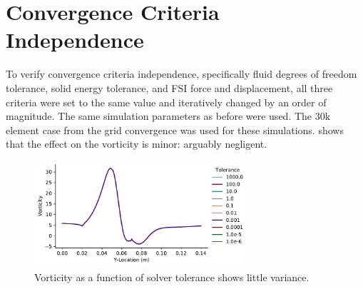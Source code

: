 \documentclass[10pt,english]{article}
\begin{document}
\newpage
\section{Convergence Criteria Independence}

To verify convergence criteria independence, specifically fluid degrees of freedom tolerance, solid energy tolerance, and FSI force and displacement, all three criteria were set to the same value and iteratively changed by an order of magnitude.  The same simulation parameters as before were used.  The 30k element case from the grid convergence was used for these simulations.   shows that the effect on the vorticity is minor: arguably negligent.  


\begin{figure}[h!]
\centering
\includegraphics[trim={.0cm .25cm .0cm 0cm},clip,width=0.70\textwidth]{fig3b_TOL}
\vspace{-10pt}
\caption{Vorticity as a function of solver tolerance shows little variance.}
\label{f:3bTOL}
\end{figure}
\end{document}
